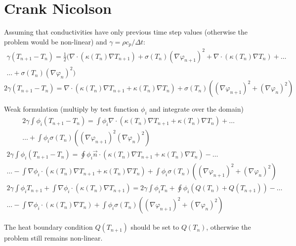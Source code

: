 \documentclass[12pt,a4paper]{article}
\numberwithin{figure}{section}
\numberwithin{table}{section}
\numberwithin{equation}{section}
\begin{document}
\section{Crank Nicolson}


Assuming that conductivities have only previous time step values (otherwise the problem would be non-linear) and $\gamma = \rho c_p / \Delta t$:
\begin{multline}
\gamma (T_{n+1} - T_n) = \frac{1}{2} ( \nabla \cdot \left( \kappa(T_n) \nabla T_{n+1} \right) + \sigma(T_n) (\nabla \varphi_{n+1})^2 + \nabla \cdot \left( \kappa(T_n) \nabla T_{n} \right) + \ldots \\ \ldots + \sigma(T_n) (\nabla \varphi_{n})^2 )
\end{multline}
\begin{equation}
2 \gamma (T_{n+1} - T_n) = \nabla \cdot \left( \kappa(T_n) \nabla T_{n+1} + \kappa(T_n) \nabla T_{n} \right) + \sigma(T_n) ( (\nabla \varphi_{n+1})^2 + (\nabla \varphi_{n})^2 ) 
\end{equation}

Weak formulation (multiply by test function $\phi_i$ and integrate over the domain)
\begin{multline}
2 \gamma \int \phi_i (T_{n+1} - T_n) = \int \phi_i \nabla \cdot \left( \kappa(T_n) \nabla T_{n+1} + \kappa(T_n) \nabla T_{n} \right) + \ldots \\ \ldots + \int \phi_i \sigma(T_n) ( (\nabla \varphi_{n+1})^2 (\nabla \varphi_{n})^2 )
\end{multline}
\begin{multline}
2 \gamma \int \phi_i (T_{n+1} - T_n) = \oint \phi_i \vec{n} \cdot \left( \kappa(T_n) \nabla T_{n+1} + \kappa(T_n) \nabla T_{n} \right) - \ldots \\ \ldots - \int \nabla \phi_i \cdot \left( \kappa(T_n) \nabla T_{n+1} + \kappa(T_n) \nabla T_{n} \right) + \int \phi_i \sigma(T_n) ( (\nabla \varphi_{n+1})^2 + (\nabla \varphi_{n})^2 )
\end{multline}
\begin{multline}
2 \gamma \int \phi_i T_{n+1} + \int \nabla \phi_i \cdot \left( \kappa(T_n) \nabla T_{n+1} \right) = 2 \gamma \int \phi_i T_n + \oint \phi_i (Q(T_n)+Q(T_{n+1})) - \ldots \\ \ldots - \int \nabla \phi_i \cdot \left( \kappa(T_n) \nabla T_{n} \right) + \int \phi_i \sigma(T_n) ( (\nabla \varphi_{n+1})^2 + (\nabla \varphi_{n})^2 )
\end{multline}

The heat boundary condition $Q(T_{n+1})$ should be set to $Q(T_{n})$, otherwise the problem still remains non-linear.



\end{document}

